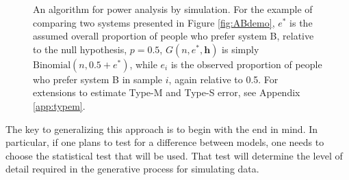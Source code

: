 \documentclass[11pt,a4paper]{article}
\begin{document}
\begin{figure}
\centering \small
{}
\caption{An algorithm for power analysis by simulation. For the example of comparing two systems presented in Figure \ref{fig:ABdemo}, $e^*$ is the assumed overall proportion of people who prefer system B, relative to the null hypothesis, $p=0.5$, $G(n, e^*, \mathbf{h})$ is simply $\textrm{Binomial}(n, 0.5+e^*)$, while $e_i$ is the observed proportion of people who prefer system B in sample $i$, again relative to 0.5.
For extensions to estimate Type-M and Type-S error, see Appendix \ref{app:typem}.}
\label{fig:algo}
\end{figure}

The key to generalizing this approach is to begin with the end in mind. In particular, if one plans to test for a difference between models, one needs to choose the statistical test that will be used. That test will determine the level of detail required in the generative process for simulating data.
\end{document}
